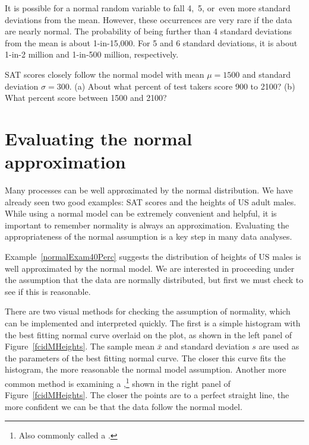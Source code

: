 It is possible for a normal random variable to fall 4,~5, or~even more standard deviations from the mean. However, these occurrences are very rare if the data are nearly normal. The probability of being further than 4 standard deviations from the mean is about 1-in-15,000. For 5 and 6 standard deviations, it is about 1-in-2 million and 1-in-500 million, respectively.

\begin{exercisewrap}
\begin{nexercise}
SAT scores closely follow the normal model with mean $\mu = 1500$ and standard deviation $\sigma = 300$. (a) About what percent of test takers score 900 to 2100? (b) What percent score between 1500 and 2100?\footnotemark
\end{nexercise}
\end{exercisewrap}

\section{Evaluating the normal approximation}
\label{assessingNormal}

Many processes can be well approximated by the normal distribution. We have already seen two good examples: SAT scores and the heights of US adult males. While using a normal model can be extremely convenient and helpful, it is important to remember normality is always an approximation. Evaluating the appropriateness of the normal assumption is a key step in many data analyses.


Example~\ref{normalExam40Perc} suggests the distribution of heights of US males is well approximated by the normal model. We are interested in proceeding under the assumption that the data are normally distributed, but first we must check to see if this is reasonable.

There are two visual methods for checking the assumption of normality, which can be implemented and interpreted quickly. The first is a simple histogram with the best fitting normal curve overlaid on the plot, as shown in the left panel of Figure~\ref{fcidMHeights}. The sample mean $\bar{x}$ and standard deviation $s$ are used as the parameters of the best fitting normal curve. The closer this curve fits the histogram, the more reasonable the normal model assumption. Another more common method is examining a ,\footnote{Also commonly called a .} shown in the right panel of Figure~\ref{fcidMHeights}. The closer the points are to a perfect straight line, the more confident we can be that the data follow the normal model.

